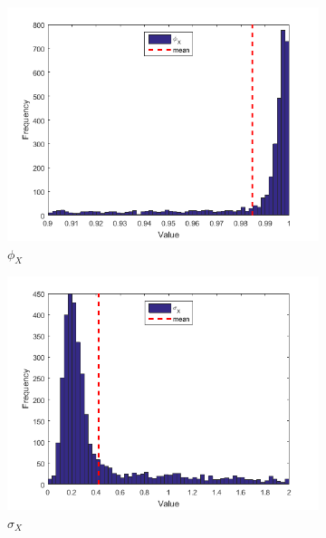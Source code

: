 \documentclass[11pt,a4,twosided,singlespacing,titlepagenumber=on]{scrreprt}
\numberwithin{equation}{chapter} %
\theoremstyle{remark}
\begin{document}
\begin{figure}[H]
    \centering
    \begin{subfigure}[t]{0.32\textwidth}
        \centering
        \includegraphics[width=1\textwidth]{res/params/5845_6575/1}
        \caption{$\phi_X$}
    \end{subfigure}
    \begin{subfigure}[t]{0.32\textwidth}
        \centering
        \includegraphics[width=1\textwidth]{res/params/5845_6575/2}
        \caption{$\sigma_X$}
    \end{subfigure}
    \begin{subfigure}[t]{0.32\textwidth}
        \centering

\end{subfigure}
\end{figure}
\end{document}
